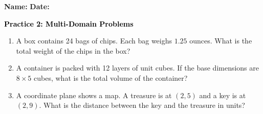 \documentclass[12pt, letterpaper, fleqn]{article}
\begin{document}
\textbf{Name:} \underline{\hspace{5cm}}
\hfill
\textbf{Date:} \underline{\hspace{3cm}}\\

\begin{tcolorbox}[colback=customteal!20]
    \large\textcolor{black}{\textbf{Practice 2: Multi-Domain Problems}}
\end{tcolorbox}
\begin{enumerate}[itemsep=3.5cm, leftmargin=0.6cm]
\item A box contains 24 bags of chips. Each bag weighs $1.25$ ounces. What is the total weight of the chips in the box?
\vspace{3.5cm}
\item A container is packed with 12 layers of unit cubes. If the base dimensions are $8 \times 5$ cubes, what is the total volume of the container?
\vspace{3.5cm}
\item A coordinate plane shows a map. A treasure is at $(2, 5)$ and a key is at $(2, 9)$. What is the distance between the key and the treasure in units?
\end{enumerate}
\end{document}
